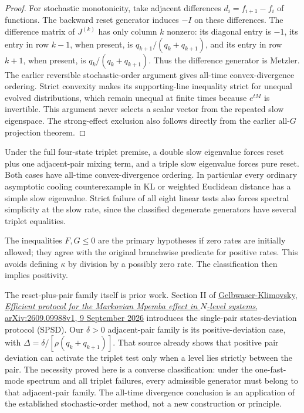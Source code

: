 \begin{proof}
For stochastic monotonicity, take adjacent differences
$d_i=f_{i+1}-f_i$ of functions. The backward reset generator induces
$-I$ on these differences. The difference matrix of $J^{(k)}$ has
only column $k$ nonzero: its diagonal entry is $-1$, its entry in
row $k-1$, when present, is $q_{k+1}/(q_k+q_{k+1})$, and its entry
in row $k+1$, when present, is $q_k/(q_k+q_{k+1})$.
Thus the difference generator is Metzler. The earlier reversible
stochastic-order argument gives all-time convex-divergence ordering.
Strict convexity makes its supporting-line inequality strict for
unequal evolved distributions, which remain unequal at finite times
because $e^{tM}$ is invertible. This argument never selects a scalar
vector from the repeated slow eigenspace. The strong-effect exclusion
also follows directly from the earlier all-$G$ projection theorem.
\end{proof}

\begin{corollary}
Under the full four-state triplet premise, a double slow eigenvalue
forces reset plus one adjacent-pair mixing term, and a triple slow
eigenvalue forces pure reset. Both cases have all-time convex-divergence
ordering. In particular every ordinary asymptotic cooling counterexample in KL
or weighted Euclidean distance has a simple slow eigenvalue. Strict failure of all eight linear tests
also forces spectral simplicity at the slow rate, since the classified
degenerate generators have several triplet equalities.
\end{corollary}

The inequalities $F,G\leq0$ are the primary hypotheses if zero
rates are initially allowed; they agree with the original branchwise
predicate for positive rates. This avoids defining $\kappa$ by division
by a possibly zero rate. The classification then implies positivity.

The reset-plus-pair family itself is prior work. Section II of
\href{https://arxiv.org/html/2609.09988v1}{Gelbwaser-Klimovsky,
\emph{Efficient protocol for the Markovian Mpemba effect in $N$-level
systems}, arXiv:2609.09988v1, 9 September 2026} introduces the single-pair
states-deviation protocol (SPSD). Our $\delta>0$ adjacent-pair family is
its positive-deviation case, with
$\Delta=\delta/[\rho(q_k+q_{k+1})]$. That source already shows that
positive pair deviation can activate the triplet test only when a level
lies strictly between the pair. The necessity proved here is a converse
classification: under the one-fast-mode spectrum and all triplet
failures, every admissible generator must belong to that adjacent-pair
family. The all-time divergence conclusion is an application of the
established stochastic-order method, not a new construction or principle.

